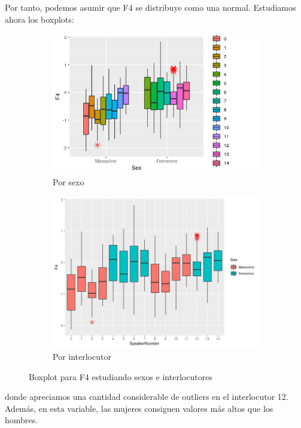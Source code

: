 Por tanto, podemos asumir que F4 se distribuye como una normal. Estudiamos ahora los boxplots:

\begin{figure}[H]
	\centering
	\begin{subfigure}{.5\textwidth}
		\centering
		\includegraphics[width=.9\linewidth]{bps4.png}
		\caption{Por sexo}
		\label{fig:bps4}
	\end{subfigure}%
	\begin{subfigure}{.5\textwidth}
		\centering
		\includegraphics[width=.9\linewidth]{bpsn4.png}
		\caption{Por interlocutor}
		\label{fig:bpsn4}
	\end{subfigure}
	\caption{Boxplot para F4 estudiando sexos e interlocutores}
	\label{fig:bf4}
\end{figure}

donde apreciamos una cantidad considerable de outliers en el interlocutor 12. Además, en esta variable, las mujeres consiguen valores más altos que los hombres. \\

